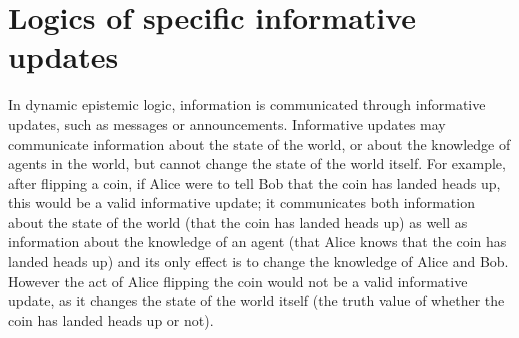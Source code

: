 


\section{Logics of specific informative updates}

In dynamic epistemic logic, information is communicated through informative updates, such as messages or announcements.
Informative updates may communicate information about the state of the world, or about the knowledge of agents in the world, but cannot change the state of the world itself.
For example, after flipping a coin, if Alice were to tell Bob that the coin has landed heads up, this would be a valid informative update; it communicates both information about the state of the world (that the coin has landed heads up) as well as information about the knowledge of an agent (that Alice knows that the coin has landed heads up) and its only effect is to change the knowledge of Alice and Bob.
However the act of Alice flipping the coin would not be a valid informative update, as it changes the state of the world itself (the truth value of whether the coin has landed heads up or not).

